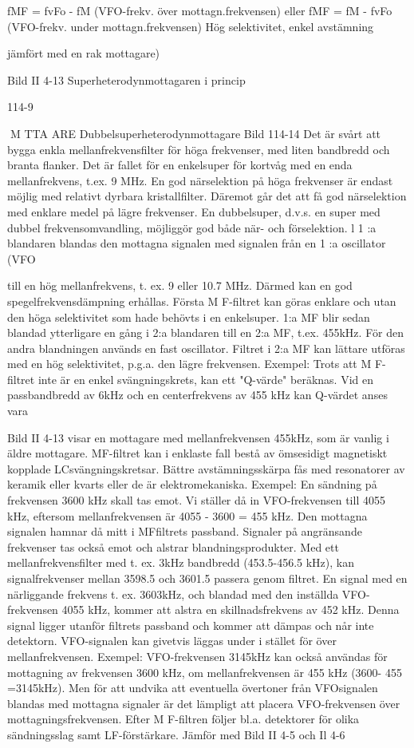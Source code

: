 fMF = fvFo - fM (VFO-frekv. över mottagn.frekvensen)
eller
fMF = fM - fvFo (VFO-frekv. under mottagn.frekvensen)
Hög selektivitet, enkel avstämning {jämfört med en rak mottagare)

Bild II 4-13 Superheterodynmottagaren i princip

114-9

M TTA ARE
Dubbelsuperheterodynmottagare
Bild 114-14
Det är svårt att bygga enkla mellanfrekvensfilter för höga frekvenser, med liten bandbredd och branta flanker. Det är fallet för en
enkelsuper för kortvåg med en enda mellanfrekvens, t.ex. 9 MHz.
En god närselektion på höga frekvenser
är endast möjlig med relativt dyrbara kristallfilter. Däremot går det att få god närselektion
med enklare medel på lägre frekvenser.
En dubbelsuper, d.v.s. en super med
dubbel frekvensomvandling, möjliggör god
både när- och förselektion. l 1 :a blandaren
blandas den mottagna signalen med signalen från en 1 :a oscillator (VFO} till en hög
mellanfrekvens, t. ex. 9 eller 10.7 MHz.
Därmed kan en god spegelfrekvensdämpning erhållas. Första M F-filtret kan göras enklare och utan den höga selektivitet
som hade behövts i en enkelsuper. 1:a MF
blir sedan blandad ytterligare en gång i 2:a
blandaren till en 2:a MF, t.ex. 455kHz. För
den andra blandningen används en fast
oscillator. Filtret i 2:a MF kan lättare utföras
med en hög selektivitet, p.g.a. den lägre
frekvensen.
Exempel:
Trots att M F-filtret inte är en enkel
svängningskrets, kan ett "Q-värde" beräknas. Vid en passbandbredd av 6kHz och en
centerfrekvens av 455 kHz kan Q-värdet
anses vara

Bild II 4-13 visar en mottagare med mellanfrekvensen 455kHz, som är vanlig i äldre
mottagare. MF-filtret kan i enklaste fall bestå av ömsesidigt magnetiskt kopplade LCsvängningskretsar. Bättre avstämningsskärpa fås med resonatorer av keramik eller
kvarts eller de är elektromekaniska.
Exempel:
En sändning på frekvensen 3600 kHz
skall tas emot. Vi ställer då in VFO-frekvensen till 4055 kHz, eftersom mellanfrekvensen är 4055 - 3600 = 455 kHz. Den
mottagna signalen hamnar då mitt i MFfiltrets passband.
Signaler på angränsande frekvenser tas
också emot och alstrar blandningsprodukter.
Med ett mellanfrekvensfilter med t. ex. 3kHz
bandbredd (453.5-456.5 kHz), kan signalfrekvenser mellan 3598.5 och 3601.5 passera genom filtret. En signal med en närliggande frekvens t. ex. 3603kHz, och blandad
med den inställda VFO-frekvensen 4055
kHz, kommer att alstra en skillnadsfrekvens
av 452 kHz. Denna signal ligger utanför
filtrets passband och kommer att dämpas
och når inte detektorn.
VFO-signalen kan givetvis läggas under
i stället för över mellanfrekvensen.
Exempel: VFO-frekvensen 3145kHz kan
också användas för mottagning av frekvensen 3600 kHz, om mellanfrekvensen är 455
kHz (3600- 455 =3145kHz). Men för att
undvika att eventuella övertoner från VFOsignalen blandas med mottagna signaler är
det lämpligt att placera VFO-frekvensen över
mottagningsfrekvensen.
Efter M F-filtren följer bl.a. detektorer för
olika sändningsslag samt LF-förstärkare.
Jämför med Bild II 4-5 och Il 4-6

